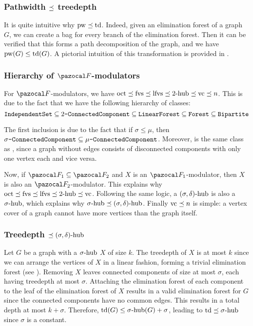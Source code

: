 \subsubsection*{Pathwidth $\lp$ treedepth}

It is quite intuitive why $\pw \lp \td$. Indeed, given an elimination forest of a graph $G$, we can create a bag for every branch of the elimination forest. Then it can be verified that this forms a path decomposition of the graph, and we have $\pw(G) \leq \td(G)$. A pictorial intuition of this transformation is provided in .



\subsubsection*{Hierarchy of $\F$-modulators}

For $\F$-modulators, we have $\oct \lp \fvs \lp \lfvs \lp \shub[2] \lp \vc \lp n$. This is due to the fact that we have the following hierarchy of classes:
$$\graphclass{IndependentSet} \subseteq \graphclass{$2$-ConnectedComponent} \subseteq \graphclass{LinearForest} \subseteq \graphclass{Forest} \subseteq \graphclass{Bipartite}$$

The first inclusion is due to the fact that if $\sigma \leq \mu$, then $\sigma\graphclass{-ConnectedComponent} \subseteq \mu\graphclass{-ConnectedComponent}$. Moreover,  is the same class as , since a graph without edges consists of disconnected components with only one vertex each and vice versa.

Now, if $\F_1 \subseteq \F_2$ and $X$ is an $\F_1$-modulator, then $X$ is also an $\F_2$-modulator. This explains why $\oct \lp \fvs \lp \lfvs \lp \shub[2] \lp \vc$. Following the same logic, a $\sdhub$ is also a $\shub$, which explains why $\shub \lp \sdhub$. Finally $\vc \lp n$ is simple: a vertex cover of a graph cannot have more vertices than the graph itself.

\subsubsection*{Treedepth $\lp \sdhub$}

Let $G$ be a graph with a $\shub$ $X$ of size $k$. The treedepth of $X$ is at most $k$ since we can arrange the vertices of $X$ in a linear fashion, forming a trivial elimination forest (see ). Removing $X$ leaves connected components of size at most $\sigma$, each having treedepth at most $\sigma$. Attaching the elimination forest of each component to the leaf of the elimination forest of $X$ results in a valid elimination forest for $G$ since the connected components have no common edges. This results in a total depth at most $k + \sigma$. Therefore, $\td(G) \leq \shub(G) + \sigma$, leading to $\td \lp \shub$ since $\sigma$ is a constant.

